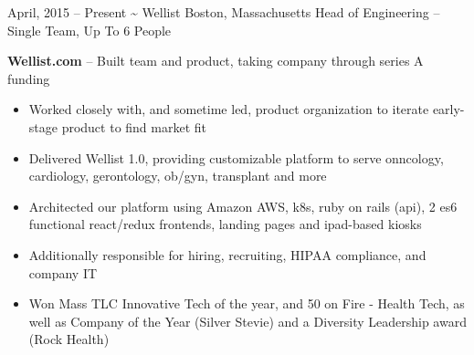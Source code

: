 \documentclass[]{friggeri-cv}
\begin{document}
\begin{entrylist}
  \entryalt
    {April, 2015 -- Present}
    {\textbf{\textasciitilde} Wellist}
    {Boston, Massachusetts}
    {Head of Engineering -- Single Team, Up To 6 People}
    {\textbf{Wellist.com} -- Built team and product, taking company through series A funding
    \begin{itemize}
      \item Worked closely with, and sometime led, product organization to iterate early-stage product to find market fit
      \item Delivered Wellist 1.0, providing customizable platform to serve onncology, cardiology, gerontology, ob/gyn, transplant and more
      \item Architected our platform using Amazon AWS, k8s, ruby on rails (api), 2 es6 functional react/redux frontends, landing pages and ipad-based kiosks
      \item Additionally responsible for hiring, recruiting, HIPAA compliance, and company IT
      \item Won Mass TLC Innovative Tech of the year, and 50 on Fire - Health Tech, as well as Company of the Year (Silver Stevie) and a Diversity Leadership award (Rock Health)
    \end{itemize}}


\end{entrylist}
\end{document}
